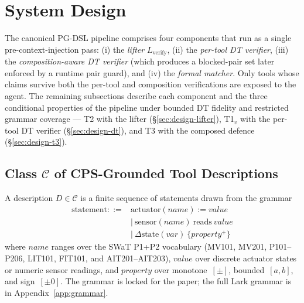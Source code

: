 \section{System Design}
\label{sec:design}
\label{sec:theory}
\label{sec:method}

The canonical PG-DSL pipeline comprises four components that run as
a single pre-context-injection pass: (i) the \emph{lifter}
$L_{\text{verify}}$, (ii) the \emph{per-tool DT verifier}, (iii) the
\emph{composition-aware DT verifier} (which produces a blocked-pair
set later enforced by a runtime pair guard), and (iv) the
\emph{formal matcher}. Only tools whose claims survive both the
per-tool and composition verifications are exposed to the agent. The
remaining subsections describe each component and the three
conditional properties of the pipeline under bounded DT fidelity and
restricted grammar coverage --- T2 with the lifter (\S\ref{sec:design-lifter}),
T1${}_v$ with the per-tool DT verifier (\S\ref{sec:design-dt}), and
T3 with the composed defence (\S\ref{sec:design-t3}).

\subsection{Class $\mathcal{C}$ of CPS-Grounded Tool Descriptions}
\label{sec:method-grammar}

A description $D \in \mathcal{C}$ is a finite sequence of statements
drawn from the grammar
\[
\begin{aligned}
\text{statement} ::= {}&
  \text{actuator}(\textit{name}) := \textit{value} \\
&\mid\ \text{sensor}(\textit{name})\ \text{reads}\ \textit{value} \\
&\mid\ \Delta\text{state}(\textit{var})\ \{\textit{property}^{+}\}
\end{aligned}
\]
where $\textit{name}$ ranges over the SWaT P1+P2 vocabulary
(MV101, MV201, P101--P206, LIT101, FIT101, and AIT201--AIT203),
$\textit{value}$ over discrete actuator states or numeric sensor
readings, and $\textit{property}$ over monotone~$[\pm]$,
bounded~$[a, b]$, and sign~$[\pm 0]$. The grammar is locked for the
paper; the full Lark grammar is in Appendix~\ref{app:grammar}.

